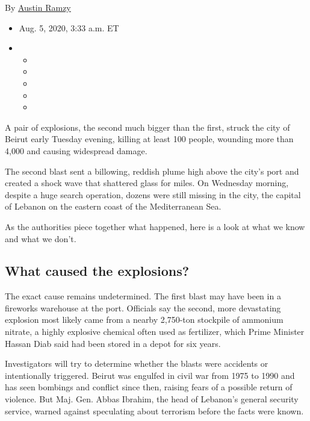 By \href{https://www.nytimes3xbfgragh.onion/by/austin-ramzy}{Austin
Ramzy}

\begin{itemize}
\item
  Aug. 5, 2020, 3:33 a.m. ET
\item
  \begin{itemize}
  \item
  \item
  \item
  \item
  \item
  \end{itemize}
\end{itemize}

A pair of explosions, the second much bigger than the first, struck the
city of Beirut early Tuesday evening, killing at least 100 people,
wounding more than 4,000 and causing widespread damage.

The second blast sent a billowing, reddish plume high above the city's
port and created a shock wave that shattered glass for miles. On
Wednesday morning, despite a huge search operation, dozens were still
missing in the city, the capital of Lebanon on the eastern coast of the
Mediterranean Sea.

As the authorities piece together what happened, here is a look at what
we know and what we don't.

\hypertarget{what-caused-the-explosions}{%
\subsection{What caused the
explosions?}\label{what-caused-the-explosions}}

The exact cause remains undetermined. The first blast may have been in a
fireworks warehouse at the port. Officials say the second, more
devastating explosion most likely came from a nearby 2,750-ton stockpile
of ammonium nitrate, a highly explosive chemical often used as
fertilizer, which Prime Minister Hassan Diab said had been stored in a
depot for six years.

Investigators will try to determine whether the blasts were accidents or
intentionally triggered. Beirut was engulfed in civil war from 1975 to
1990 and has seen bombings and conflict since then, raising fears of a
possible return of violence. But Maj. Gen. Abbas Ibrahim, the head of
Lebanon's general security service, warned against speculating about
terrorism before the facts were known.

